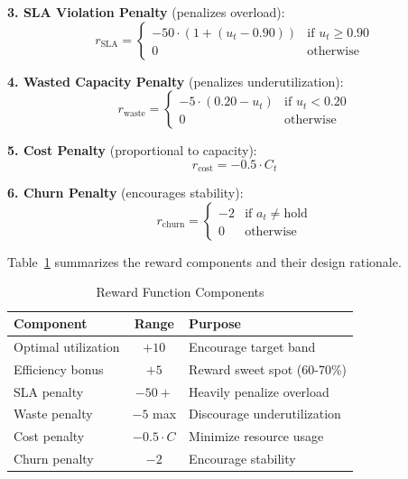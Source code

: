 \documentclass[conference]{IEEEtran}
\begin{document}
\textbf{3. SLA Violation Penalty} (penalizes overload):
\begin{equation}
r_{\text{SLA}} = \begin{cases}
-50 \cdot (1 + (u_t - 0.90)) & \text{if } u_t \geq 0.90 \\
0 & \text{otherwise}
\end{cases}
\end{equation}

\textbf{4. Wasted Capacity Penalty} (penalizes underutilization):
\begin{equation}
r_{\text{waste}} = \begin{cases}
-5 \cdot (0.20 - u_t) & \text{if } u_t < 0.20 \\
0 & \text{otherwise}
\end{cases}
\end{equation}

\textbf{5. Cost Penalty} (proportional to capacity):
\begin{equation}
r_{\text{cost}} = -0.5 \cdot C_t
\end{equation}

\textbf{6. Churn Penalty} (encourages stability):
\begin{equation}
r_{\text{churn}} = \begin{cases}
-2 & \text{if } a_t \neq \text{hold} \\
0 & \text{otherwise}
\end{cases}
\end{equation}

Table~\ref{tab:reward_summary} summarizes the reward components and their design rationale.

\begin{table}[htbp]
\centering
\caption{Reward Function Components}
\label{tab:reward_summary}
\begin{tabular}{lcl}
\toprule
\textbf{Component} & \textbf{Range} & \textbf{Purpose} \\
\midrule
Optimal utilization & $+10$ & Encourage target band \\
Efficiency bonus & $+5$ & Reward sweet spot (60-70\%) \\
SLA penalty & $-50+$ & Heavily penalize overload \\
Waste penalty & $-5$ max & Discourage underutilization \\
Cost penalty & $-0.5 \cdot C$ & Minimize resource usage \\
Churn penalty & $-2$ & Encourage stability \\
\bottomrule
\end{tabular}
\end{table}
\end{document}
